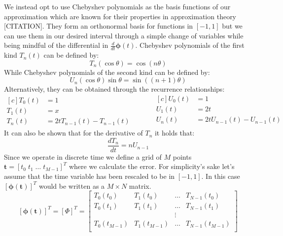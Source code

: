 \documentclass{article}
\begin{document}
    We instead opt to use Chebyshev polynomials as the basis functions of our approximation which are known for their
    properties in approximation theory [CITATION].
    They form an orthonormal basis for functions in $[-1,1]$ but we can use them in our desired interval through a
    simple change of variables while being mindful of the differential in $\frac{d}{dt} \pmb{\phi}(t) $.
    Chebyshev polynomials of the first kind $T_n(t)$ can be defined by:
    \begin{equation}
        T_n(\cos \theta) = \cos(n \theta)
    \end{equation}
    While Chebyshev polynomials of the second kind can be defined by:
    \begin{equation}
        U_n(\cos \theta) \sin \theta = \sin( (n+1)\theta )
    \end{equation}
    Alternatively, they can be obtained through the recurrence relationships:
    \begin{equation}
        \label{eq:cheb_rec}
        \begin{aligned}[c]
            T_0(t) &= 1 \\
            T_1(t) &= x \\
            T_n(t) &= 2tT_{n-1}(t) - T_{n-1}(t)
        \end{aligned}
        \qquad \quad
        \begin{aligned}[c]
            U_0(t) &= 1 \\
            U_1(t) &= 2t\\
            U_n(t) &= 2tU_{n-1}(t) - U_{n-1}(t)\\
        \end{aligned}
    \end{equation}
    It can also be shown that for the derivative of $T_n$ it holds that:
    \begin{equation}
        \frac{dT_n}{dt} = n U_{n-1}
        \label{Dcheb}
    \end{equation}
    Since we operate in discrete time we define a grid of $M$ points $\pmb{t} = [t_0 \; t_1 \; \dots \; t_{M-1}]^T$
    where we calculate the error.
    For simplicity's sake let's assume that the time variable has been rescaled to be in $[-1,1]$.
    In this case $\left[ \pmb{\phi}(\pmb{t}) \right]^T$ would be written as a $M \times N$ matrix.
    \begin{equation}
        \left[ \pmb{\phi}(\pmb{t})  \right]^T = \left[ \Phi \right]^T =
        \begin{bmatrix}
            T_0(t_0)     & T_1(t_0)     & \dots & T_{N-1}(t_{0})   \\
            T_0(t_1)     & T_1(t_1)     & \dots & T_{N-1}(t_1)     \\
            & & \vdots \\
            T_0(t_{M-1}) & T_1(t_{M-1}) & \dots & T_{N-1}(t_{M-1}) \\
        \end{bmatrix}\label{eq:cheb_mat}
    \end{equation}
\end{document}
